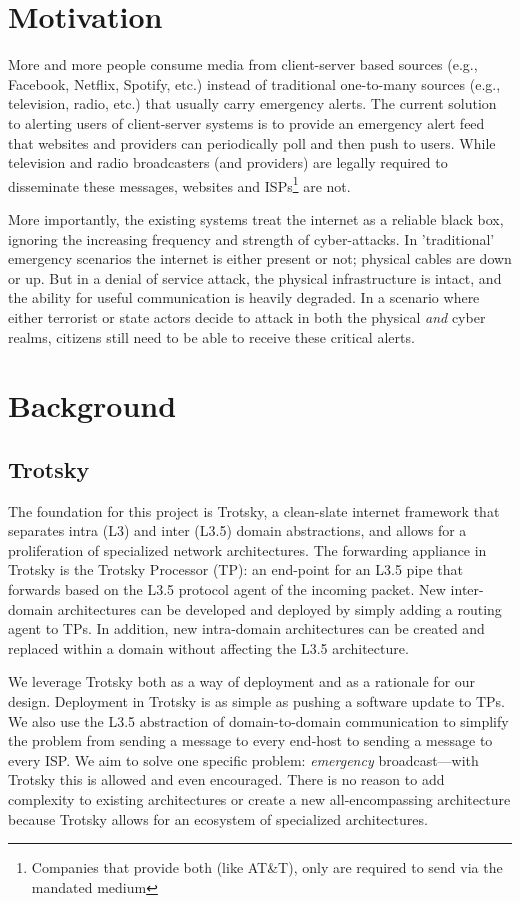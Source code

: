 \section{Motivation}

More and more people consume media from client-server based sources (e.g., Facebook, Netflix, Spotify, etc.) instead of traditional one-to-many sources (e.g., television, radio, etc.) that usually carry emergency alerts. The current solution to alerting users of client-server systems is to provide an emergency alert feed that websites and providers can periodically poll and then push to users. While television and radio broadcasters (and providers) are legally required to disseminate these messages, websites and ISPs\footnote{Companies that provide both (like AT\&T), only are required to send via the mandated medium} are not.\cite{cfr47}

More importantly, the existing systems treat the internet as a reliable black box, ignoring the increasing frequency and strength of cyber-attacks. In 'traditional' emergency scenarios the internet is either present or not; physical cables are down or up. But in a denial of service attack, the physical infrastructure is intact, and the ability for useful communication is heavily degraded. In a scenario where either terrorist or state actors decide to attack in both the physical \textit{and} cyber realms, citizens still need to be able to receive these critical alerts.

\section{Background}
\subsection{Trotsky}
The foundation for this project is Trotsky, a clean-slate internet framework that separates intra (L3) and inter (L3.5) domain abstractions, and allows for a proliferation of specialized network architectures. The forwarding appliance in Trotsky is the Trotsky Processor (TP): an end-point for an L3.5 pipe that forwards based on the L3.5 protocol agent of the incoming packet. New inter-domain architectures can be developed and deployed by simply adding a routing agent to TPs. In addition, new intra-domain architectures can be created and replaced within a domain without affecting the L3.5 architecture.

We leverage Trotsky both as a way of deployment and as a rationale for our design. Deployment in Trotsky is as simple as pushing a software update to TPs. We also use the L3.5 abstraction of domain-to-domain communication to simplify the problem from sending a message to every end-host to sending a message to every ISP. We aim to solve one specific problem: \textit{emergency} broadcast---with Trotsky this is allowed and even encouraged. There is no reason to add complexity to existing architectures or create a new all-encompassing architecture because Trotsky allows for an ecosystem of specialized architectures. 

